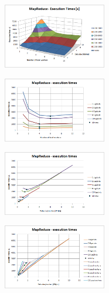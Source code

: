 \documentclass[conference,final]{IEEEtran}
\begin{document}
\begin{figure}[t]
  \includegraphics[width=0.4\textwidth]{MapReduce_local_executiontime_3d.png}
\label{}
\end{figure}

\begin{figure}[t]
  \includegraphics[width=0.4\textwidth]{MapReduce_local_executiontime.png}
\label{}
\end{figure}

\begin{figure}[t]  \includegraphics[width=0.4\textwidth]{MapReduce_local_executiontimeperworkerdatasize.png}\label{}
\end{figure}


\begin{figure}[t]
\includegraphics[width=0.4\textwidth]{MapReduce_local_executiontimeworkersdatasize2.png}
\label{}
\end{figure}
\end{document}
